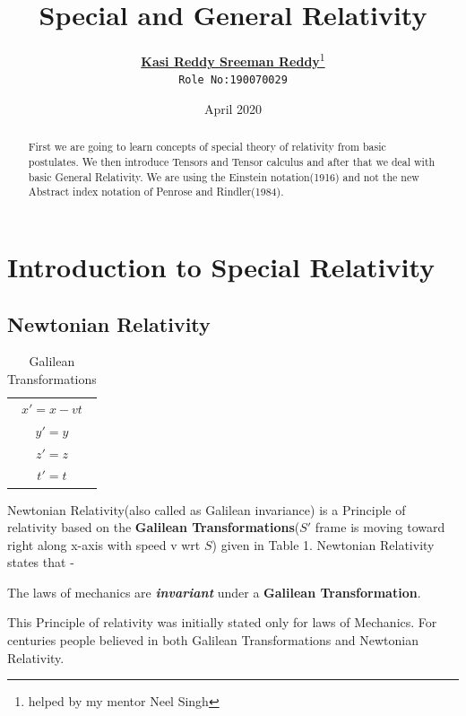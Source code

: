 \documentclass[12pt,a4paper]{article}
\title{Special and General Relativity}
\author{
  \textbf{\href{mailto:sreemanmohanreddy@gmail.com}{Kasi Reddy Sreeman Reddy}}\thanks{helped by my mentor Neel Singh}\\
  \texttt{Role No:190070029}
}
\date{April 2020}
\numberwithin{table}{section}
\numberwithin{figure}{section}
\numberwithin{equation}{section}
\theoremstyle{remark}
\theoremstyle{definition}
\begin{document}
\maketitle
\begin{abstract}
First we are going to learn concepts of special theory of relativity from basic postulates. We then introduce Tensors and Tensor calculus and after that we deal with basic General Relativity. We are using the Einstein notation(1916) and not the new Abstract index notation of Penrose and Rindler(1984).
\end{abstract}
\tableofcontents
\section{Introduction to Special Relativity}
\subsection{Newtonian Relativity}

\begin{table}[h!]
\begin{center}
\begin{tabular}{|c|}

\hline
$x' = x-vt$  \\ 
$y' = y$\\  
$z' = z$\\ 
$t' = t$\\
\hline

\end{tabular}
\caption{Galilean Transformations}
 \label{table:1}

\end{center}
\end{table}
Newtonian Relativity(also called as Galilean invariance) is a Principle of relativity based on the \textbf{Galilean Transformations}($S'$ frame is moving toward right along x-axis with speed v wrt $S$) given in Table 1. Newtonian Relativity states that -
\begin{displayquote}
The laws of mechanics are \textbf{\textit{invariant}} under a \textbf{Galilean Transformation}.
\end{displayquote}
This Principle of relativity was initially stated only for laws of Mechanics. For centuries people believed in both Galilean Transformations and Newtonian Relativity.
\end{document}
